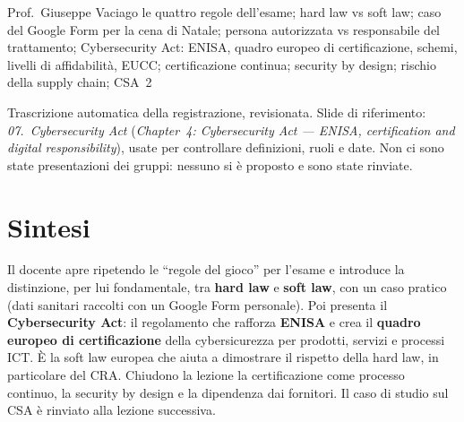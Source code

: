   {Prof.~Giuseppe Vaciago}
  {le quattro regole dell'esame; hard law vs soft law; caso del Google Form per la cena di Natale;
   persona autorizzata vs responsabile del trattamento; Cybersecurity Act: ENISA, quadro europeo di
   certificazione, schemi, livelli di affidabilità, EUCC; certificazione continua; security by design;
   rischio della supply chain; CSA~2}
\label{lez:2026-11-09}

\begin{nota}[Fonte]
Trascrizione automatica della registrazione, revisionata. Slide di riferimento: \emph{07.\ Cybersecurity
Act} (\emph{Chapter~4: Cybersecurity Act --- ENISA, certification and digital responsibility}), usate per
controllare definizioni, ruoli e date. Non ci sono state presentazioni dei gruppi:
nessuno si è proposto e sono state rinviate.
\end{nota}

\section{Sintesi}
Il docente apre ripetendo le ``regole del gioco'' per l'esame e introduce la distinzione, per lui
fondamentale, tra \textbf{hard law} e \textbf{soft law}, con un caso pratico (dati sanitari raccolti
con un Google Form personale). Poi presenta il \textbf{Cybersecurity Act}: il regolamento che rafforza
\textbf{ENISA} e crea il \textbf{quadro europeo di certificazione} della cybersicurezza per prodotti,
servizi e processi ICT. È la soft law europea che aiuta a dimostrare il rispetto della hard law, in
particolare del CRA. Chiudono la lezione la certificazione come processo continuo, la security by
design e la dipendenza dai fornitori. Il caso di studio sul CSA è rinviato alla lezione successiva.

